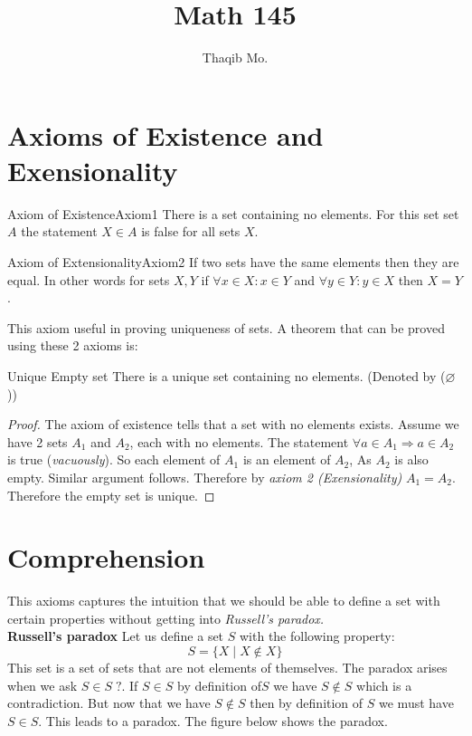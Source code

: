 \documentclass[16pt,a4paper]{article}
\author{Thaqib Mo.}
\title{Math 145}
\let\emptyset\varnothing
\theoremstyle{definition}
\begin{document}
\maketitle
\tableofcontents
\newpage
\section{Axioms of Existence and Exensionality}

\begin{axm}{Axiom of Existence}{Axiom1} There is a set containing no elements. For this set set $A$ the statement $X\in A$ is false for all sets $X$.
\end{axm}

\begin{axm}{Axiom of Extensionality}{Axiom2}
If two sets have the same elements then they are equal. In other words for sets $X,Y$ if $\forall x \in X : x\in Y$ and $\forall y\in Y : y\in X$ then $X=Y$. 
\end{axm}
This axiom useful in proving uniqueness of sets. A theorem that can be proved using these 2 axioms is:
\begin{thm}{Unique Empty set}{}
There is a unique set containing no elements. (Denoted by ($\emptyset$))
\end{thm}
\begin{proof}
The axiom of existence tells that a set with no elements exists. Assume we have 2 sets $A_1$ and $A_2$, each with no elements.  The statement $\forall a \in A_1 \Rightarrow a \in A_2$ is true (\textit{vacuously}). So each element of $A_1$ is an element of $A_2$, As $A_2$ is also empty. Similar argument follows. Therefore by \textit{axiom 2 (Exensionality)} $A_1 = A_2$. Therefore the empty set is unique. 
\end{proof}
\section{Comprehension}
This axioms captures the intuition that we should be able to define a set with certain properties without getting into \textit{Russell's paradox. } \\
\textbf{Russell's paradox}
Let us define a set $S$ with the following property:
\[S = \{X \; | \; X\notin X\}\]
This set is a set of sets that are not elements of themselves. The paradox arises when we ask $S\in S\;?$.\linebreak 
If $S\in S$ by definition of$S$ we have $S\notin S$ which is a contradiction. But now that we have $S\notin S$ then  by definition of $S$ we must have $S\in S$. This leads to a paradox.  The figure below shows the paradox. 
\end{document}

